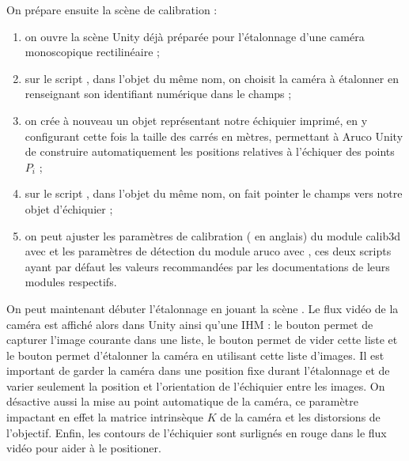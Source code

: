 
On prépare ensuite la scène de calibration :
\begin{enumerate}
  \item on ouvre la scène Unity  déjà préparée pour l'étalonnage d'une caméra monoscopique rectilinéaire ;
  \item sur le script , dans l'objet du même nom, on choisit la caméra à étalonner en renseignant son identifiant numérique dans le champs  ;
  \item on crée à nouveau un objet représentant notre échiquier imprimé, en y configurant cette fois la taille des carrés en mètres, permettant à Aruco Unity de construire automatiquement les positions relatives à l'échiquer des points $P_i$ ;
  \item sur le script , dans l'objet du même nom, on fait pointer le champs  vers notre objet d'échiquier ;
  \item on peut ajuster les paramètres de calibration ( en anglais) du module calib3d avec  et les paramètres de détection du module aruco avec , ces deux scripts ayant par défaut les valeurs recommandées par les documentations de leurs modules respectifs.
\end{enumerate}


On peut maintenant débuter l'étalonnage en jouant la scène . Le flux vidéo de la caméra est affiché alors dans Unity ainsi qu'une IHM : le bouton  permet de capturer l'image courante dans une liste, le bouton  permet de vider cette liste et le bouton  permet d'étalonner la caméra en utilisant cette liste d'images. Il est important de garder la caméra dans une position fixe durant l'étalonnage et de varier seulement la position et l'orientation de l'échiquier entre les images. On désactive aussi la mise au point automatique de la caméra, ce paramètre impactant en effet la matrice intrinsèque	$K$ de la caméra et les distorsions de l'objectif. Enfin, les contours de l'échiquier sont surlignés en rouge dans le flux vidéo pour aider à le positioner.

